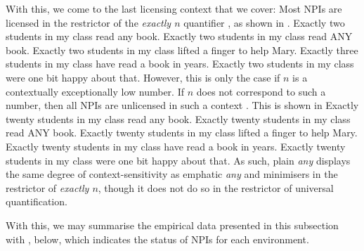 With this, we come to the last licensing context that we cover: Most NPIs are licensed in the restrictor of the \textit{exactly $n$} quantifier \textcite{Linebarger1980,Linebarger1987}, as shown in .
\pex\label{ex:npi-nm-okay}
\a Exactly two students in my class read any book.
\a Exactly two students in my class read \MakeUppercase{any} book.
\a Exactly two students in my class lifted a finger to help Mary.
\a\ljudge{\#} Exactly three students in my class have read a book in years.
\a\ljudge{\#} Exactly two students in my class were one bit happy about that.
\xe
However, this is only the case if $n$ is a contextually exceptionally low number. If $n$ does not correspond to such a number, then all NPIs are unlicensed in such a context \parencite{Crnic2011,Crnic2014-dogma,Crnic2014-nm}. This is shown in 
\pex\label{ex:npi-nm-bad}
\a\ljudge{\#} Exactly twenty students in my class read any book.
\a\ljudge{\#} Exactly twenty students in my class read \MakeUppercase{any} book.
\a\ljudge{\#} Exactly twenty students in my class lifted a finger to help Mary.
\a\ljudge{\#} Exactly twenty students in my class have read a book in years.
\a\ljudge{\#} Exactly twenty students in my class were one bit happy about that.
\xe
As such, plain \textit{any} displays the same degree of context-sensitivity as emphatic \textit{any} and minimisers in the restrictor of \textit{exactly $n$}, though it does not do so in the restrictor of universal quantification.

With this, we may summarise the empirical data presented in this subsection with , below, which indicates the status of NPIs for each environment.
\begin{table}[!htb]
\end{table}

